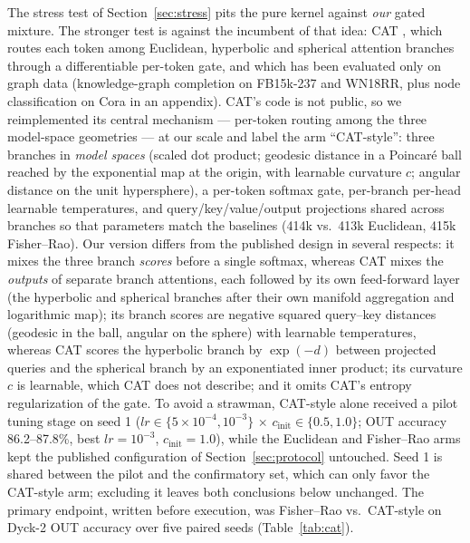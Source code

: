 \documentclass[11pt]{article}
\begin{document}
The stress test of Section~\ref{sec:stress} pits the pure kernel against \emph{our} gated mixture. The stronger test is against the incumbent of that idea: CAT \cite{lin2025cat}, which routes each token among Euclidean, hyperbolic and spherical attention branches through a differentiable per-token gate, and which has been evaluated only on graph data (knowledge-graph completion on FB15k-237 and WN18RR, plus node classification on Cora in an appendix). CAT's code is not public, so we reimplemented its central mechanism --- per-token routing among the three model-space geometries --- at our scale and label the arm ``CAT-style'': three branches in \emph{model spaces} (scaled dot product; geodesic distance in a Poincar\'e ball reached by the exponential map at the origin, with learnable curvature $c$; angular distance on the unit hypersphere), a per-token softmax gate, per-branch per-head learnable temperatures, and query/key/value/output projections shared across branches so that parameters match the baselines (414k vs.\ 413k Euclidean, 415k Fisher--Rao). Our version differs from the published design in several respects: it mixes the three branch \emph{scores} before a single softmax, whereas CAT mixes the \emph{outputs} of separate branch attentions, each followed by its own feed-forward layer (the hyperbolic and spherical branches after their own manifold aggregation and logarithmic map); its branch scores are negative squared query--key distances (geodesic in the ball, angular on the sphere) with learnable temperatures, whereas CAT scores the hyperbolic branch by $\exp(-d)$ between projected queries and the spherical branch by an exponentiated inner product; its curvature $c$ is learnable, which CAT does not describe; and it omits CAT's entropy regularization of the gate. To avoid a strawman, CAT-style alone received a pilot tuning stage on seed 1 ($lr \in \{5\times10^{-4}, 10^{-3}\}$ $\times$ $c_{\mathrm{init}} \in \{0.5, 1.0\}$; OUT accuracy 86.2--87.8\%, best $lr = 10^{-3}$, $c_{\mathrm{init}} = 1.0$), while the Euclidean and Fisher--Rao arms kept the published configuration of Section~\ref{sec:protocol} untouched. Seed 1 is shared between the pilot and the confirmatory set, which can only favor the CAT-style arm; excluding it leaves both conclusions below unchanged. The primary endpoint, written before execution, was Fisher--Rao vs.\ CAT-style on Dyck-2 OUT accuracy over five paired seeds (Table~\ref{tab:cat}).
\end{document}
